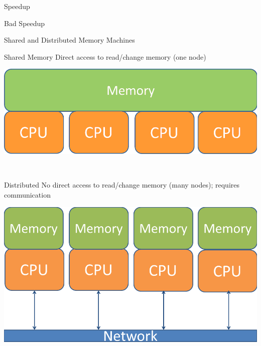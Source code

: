 \begin{frame}
\begin{block}{Speedup}
\begin{center}
\begin{minipage}{.475\textwidth}
\begin{block}{Bad Speedup}
    \end{block}
    \end{minipage}
    \end{center}
    \end{block}
\end{frame}


\begin{frame}
  \begin{block}{Shared and Distributed Memory Machines}
   \begin{center}
    \begin{minipage}{.475\textwidth}
    \begin{block}{Shared Memory}
     Direct access to read/change memory (one node) \vspace{.3cm} \ 
      \begin{center}
      \includegraphics[width=.95\textwidth]{../common/pics/arch_shared}
      \end{center}
      \vspace{.3cm} \
    \end{block}
    \end{minipage}
    \hspace{.1cm}
    \begin{minipage}{.475\textwidth}
    \begin{block}{Distributed}
    No direct access to read/change memory (many nodes); requires communication
      \begin{center}
      \includegraphics[width=.95\textwidth]{../common/pics/arch_distributed}
      \end{center}
    \end{block}
    \end{minipage}
    \end{center}
    \end{block}
\end{frame}


